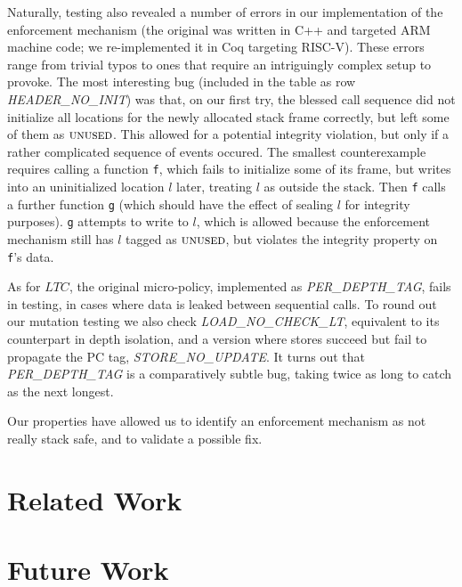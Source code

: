 \documentclass[10pt,conference]{ieeetran}%
\theoremstyle{definition}
\begin{document}
Naturally, testing also revealed a number of errors in our
implementation of the enforcement mechanism (the original was written in C++
and targeted ARM machine code;
we re-implemented it in Coq targeting RISC-V).  These errors range
from trivial typos to ones that require an intriguingly complex setup
to provoke.  The most interesting bug (included in the table as row
{\em HEADER\_NO\_INIT}) was that, on our first try, the blessed call
sequence %
did not initialize all locations for the
newly allocated stack frame correctly, but left some of them as
$\textsc{unused}$. This allowed for a potential integrity violation, but
only if a rather complicated sequence of events occured.
The smallest counterexample requires calling a function {\tt f},
which fails to initialize some of its frame,
but writes into an uninitialized location $l$ later, treating \(l\) as outside
the stack. Then {\tt f} calls a further function {\tt g} (which should have
the effect of sealing $l$ for integrity purposes). {\tt g} attempts to write to $l$,
which is allowed because the enforcement mechanism still has
$l$ tagged as $\textsc{unused}$, but violates the integrity property on {\tt f}'s data.

As for \(LTC\), the original micro-policy, implemented as {\em PER\_DEPTH\_TAG},
fails in testing, in cases where data is leaked between sequential calls.
To round out our mutation testing we also check {\em LOAD\_NO\_CHECK\_LT},
equivalent to its counterpart in depth isolation,
and a version where stores succeed but fail to propagate the PC tag, {\em STORE\_NO\_UPDATE}.
It turns out that {\em PER\_DEPTH\_TAG} is a comparatively subtle bug,
taking twice as long to catch as the next longest.

Our properties have allowed us to identify an enforcement mechanism as
not really stack safe, and to validate a possible fix.

\section{Related Work}


\section{Future Work}
\label{sec:future}
\end{document}
